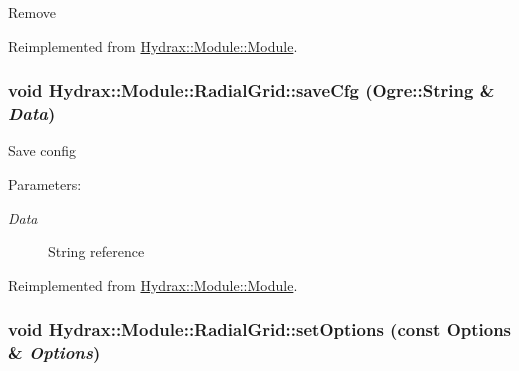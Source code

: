 Remove 

Reimplemented from \hyperlink{class_hydrax_1_1_module_1_1_module_21f60a53a99d72ff00d3fe5565518165}{Hydrax::Module::Module}.\hypertarget{class_hydrax_1_1_module_1_1_radial_grid_241237552e8f36f7e4696b8bad7acc91}{
\subsubsection[{saveCfg}]{\setlength{\rightskip}{0pt plus 5cm}void Hydrax::Module::RadialGrid::saveCfg (Ogre::String \& {\em Data})}}
\label{class_hydrax_1_1_module_1_1_radial_grid_241237552e8f36f7e4696b8bad7acc91}


Save config \begin{Desc}
\item[Parameters:]
\begin{description}
\item[{\em Data}]String reference \end{description}
\end{Desc}


Reimplemented from \hyperlink{class_hydrax_1_1_module_1_1_module_998a5baf42f57b02ca7bc20bc12f95a9}{Hydrax::Module::Module}.\hypertarget{class_hydrax_1_1_module_1_1_radial_grid_cfc2ae157df9b6159302a90561ffc038}{
\subsubsection[{setOptions}]{\setlength{\rightskip}{0pt plus 5cm}void Hydrax::Module::RadialGrid::setOptions (const {\bf Options} \& {\em Options})}}
\label{class_hydrax_1_1_module_1_1_radial_grid_cfc2ae157df9b6159302a90561ffc038}



